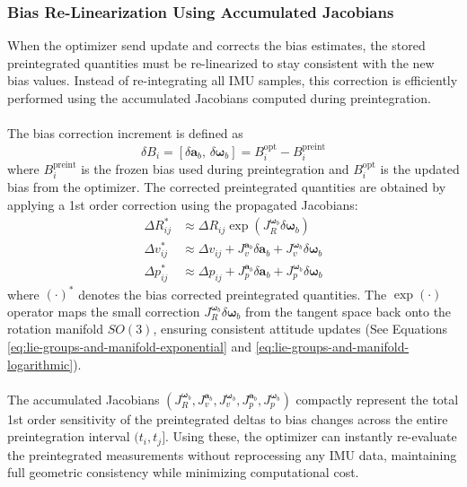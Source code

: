 \subsubsection{Bias Re-Linearization Using Accumulated Jacobians}
When the optimizer send update and corrects the bias estimates, the stored preintegrated quantities must be re-linearized to stay consistent with the new bias values. Instead of re-integrating all IMU samples, this correction is efficiently performed using the accumulated Jacobians computed during preintegration.
\\ \\
The bias correction increment is defined as
$$
    \delta B_i = [\delta \mathbf{a}_b, \, \delta \boldsymbol{\omega}_b] = B_i^{\text{opt}} - B_i^{\text{preint}}
$$
where $B_i^{\text{preint}}$ is the frozen bias used during preintegration and $B_i^{\text{opt}}$ is the updated bias from the optimizer. The corrected preintegrated quantities are obtained by applying a 1st order correction using the propagated Jacobians:
$$
    \begin{aligned}
        \Delta R_{ij}^{*} &\approx \Delta R_{ij}\exp(J_R^{\boldsymbol{\omega}_b}\delta\boldsymbol{\omega}_b) \\
        \Delta v_{ij}^{*} &\approx \Delta v_{ij} + J_v^{\mathbf{a}_b}\delta\mathbf{a}_b + J_v^{\boldsymbol{\omega}_b}\delta\boldsymbol{\omega}_b \\
        \Delta p_{ij}^{*} &\approx \Delta p_{ij} + J_p^{\mathbf{a}_b}\delta\mathbf{a}_b + J_p^{\boldsymbol{\omega}_b}\delta\boldsymbol{\omega}_b
    \end{aligned}
$$
where $(\cdot)^*$ denotes the bias corrected preintegrated quantities. The $\exp(\cdot)$ operator maps the small correction $J_R^{\boldsymbol{\omega}_b}\delta\boldsymbol{\omega}_b$ from the tangent space back onto the rotation manifold $SO(3)$, ensuring consistent attitude updates (See Equations \ref{eq:lie-groups-and-manifold-exponential} and \ref{eq:lie-groups-and-manifold-logarithmic}).
\\ \\
The accumulated Jacobians $(J_R^{\boldsymbol{\omega}_b}, J_v^{\mathbf{a}_b}, J_v^{\boldsymbol{\omega}_b}, J_p^{\mathbf{a}_b}, J_p^{\boldsymbol{\omega}_b})$ compactly represent the total 1st order sensitivity of the preintegrated deltas to bias changes across the entire preintegration interval $(t_i, t_j]$. Using these, the optimizer can instantly re-evaluate the preintegrated measurements without reprocessing any IMU data, maintaining full geometric consistency while minimizing computational cost.



